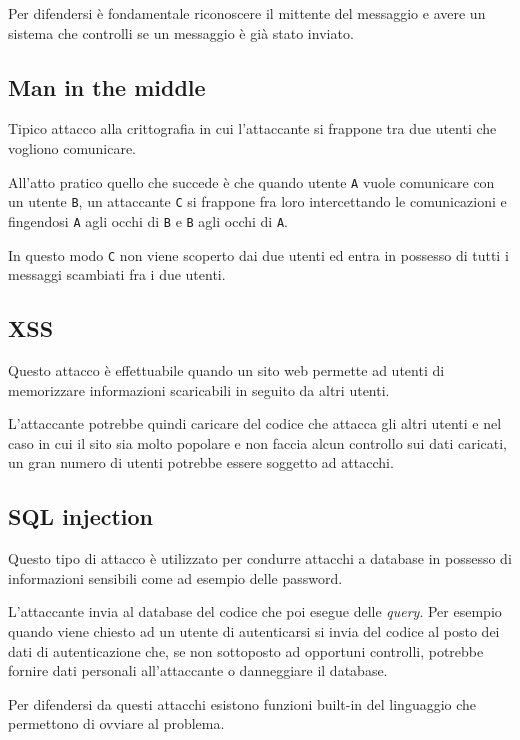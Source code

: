 Per difendersi è fondamentale riconoscere il mittente del messaggio e avere un sistema che controlli se un messaggio è
già stato inviato.

\subsection{Man in the middle}
Tipico attacco alla crittografia in cui l'attaccante si frappone tra due utenti che vogliono comunicare.

All'atto pratico quello che succede è che quando utente \verb|A| vuole comunicare con un utente \verb|B|, un attaccante
\verb|C| si frappone fra loro intercettando le comunicazioni e fingendosi \verb|A| agli occhi di \verb|B| e \verb|B|
agli occhi di \verb|A|.

In questo modo \verb|C| non viene scoperto dai due utenti ed entra in possesso di tutti i messaggi scambiati fra i due
utenti.

\subsection{XSS}
Questo attacco è effettuabile quando un sito web permette ad utenti di memorizzare informazioni scaricabili in seguito
da altri utenti.

L'attaccante potrebbe quindi caricare del codice che attacca gli altri utenti e nel caso in cui il sito sia molto
popolare e non faccia alcun controllo sui dati caricati, un gran numero di utenti potrebbe essere soggetto ad attacchi.

\subsection{SQL injection}
Questo tipo di attacco è utilizzato per condurre attacchi a database in possesso di informazioni sensibili come ad
esempio delle password.

L'attaccante invia al database del codice che poi esegue delle \emph{query}. Per esempio quando viene chiesto ad un
utente di autenticarsi si invia del codice al posto dei dati di autenticazione che, se non sottoposto ad opportuni
controlli, potrebbe fornire dati personali all'attaccante o danneggiare il database.

Per difendersi da questi attacchi esistono funzioni built-in del linguaggio che permettono di ovviare al problema.